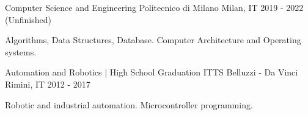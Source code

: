 

\begin{cventries}

  \cventry
    {Computer Science and Engineering} %
    {Politecnico di Milano} %
    {Milan, IT} %
    {2019 - 2022 (Unfinished)} %
    {
      \begin{cvitems} %
        \item {Algorithms, Data Structures, Database. Computer Architecture and Operating systems.}
      \end{cvitems}
    }
    
  \cventry
    {Automation and Robotics | High School Graduation} %
    {ITTS Belluzzi - Da Vinci} %
    {Rimini, IT} %
    {2012 - 2017} %
    {
      \begin{cvitems} %
        \item {Robotic and industrial automation. Microcontroller programming.}
      \end{cvitems}
    }

\end{cventries}
